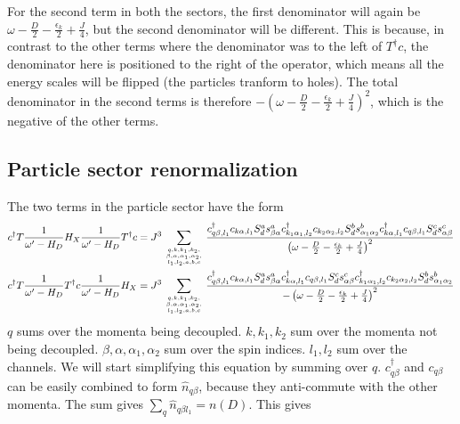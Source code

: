 \documentclass[12pt]{revtex4-2}
\begin{document}
For the second term in both the sectors, the first denominator will again be \(\omega - \frac{D}{2} - \frac{\epsilon_k}{2} + \frac{J}{4}\), but the second denominator will be different. This is because, in contrast to the other terms where the denominator was to the left of \(T^\dagger c\), the denominator here is positioned to the right of the operator, which means all the energy scales will be flipped (the particles tranform to holes). The total denominator in the second terms is therefore \(-\left(\omega - \frac{D}{2} -  \frac{\epsilon_k}{2} + \frac{J}{4}\right)^2\), which is the negative of the other terms.

\subsection{Particle sector renormalization}
The two terms in the particle sector have the form
\begin{align}
	c^\dagger T \frac{1}{\omega^\prime - H_D} H_X \frac{1}{\omega^\prime - H_D} T^\dagger c = J^3\sum_{q, k, k_1,k_2,\atop{\beta, \alpha, \alpha_1,\alpha_2,\atop{l_1,l_2,a,b,c}}} \frac{c^\dagger_{q\beta,l_1} c_{k\alpha,l_1} S_d^a s^a_{\beta \alpha} c^\dagger_{k_1\alpha_1,l_2}c_{k_2 \alpha_2,l_2} S_d^b s^b_{\alpha_1 \alpha_2} c^\dagger_{k\alpha, l_1} c_{q\beta, l_1} S_d^c s^c_{\alpha \beta}}{\left(\omega - \frac{D}{2} - \frac{\epsilon_k}{2} + \frac{J}{4}\right)^2}\\
	c^\dagger T \frac{1}{\omega^\prime - H_D} T^\dagger c \frac{1}{\omega^\prime - H_D} H_X = J^3\sum_{q, k, k_1,k_2,\atop{\beta, \alpha, \alpha_1,\alpha_2,\atop{l_1,l_2,a,b,c}}} \frac{c^\dagger_{q\beta,l_1} c_{k\alpha,l_1} S_d^a s^a_{\beta \alpha} c^\dagger_{k\alpha, l_1} c_{q\beta, l_1} S_d^c s^c_{\alpha \beta} c^\dagger_{k_1\alpha_1,l_2}c_{k_2 \alpha_2,l_2} S_d^b s^b_{\alpha_1 \alpha_2}}{-\left(\omega - \frac{D}{2} - \frac{\epsilon_k}{2} + \frac{J}{4}\right)^2}
\end{align}
\(q\) sums over the momenta being decoupled. \(k, k_1,k_2\) sum over the momenta not being decoupled. \(\beta, \alpha, \alpha_1,\alpha_2\) sum over the spin indices. \(l_1,l_2\) sum over the channels. We will start simplifying this equation by summing over \(q\). \(c^\dagger_{q\beta}\) and \(c_{q\beta}\) can be easily combined to form \(\hat n_{q\beta}\), because they anti-commute with the other momenta. The sum gives \(\sum_q \hat n_{q\beta l_1} = n(D) \). This gives
\end{document}
